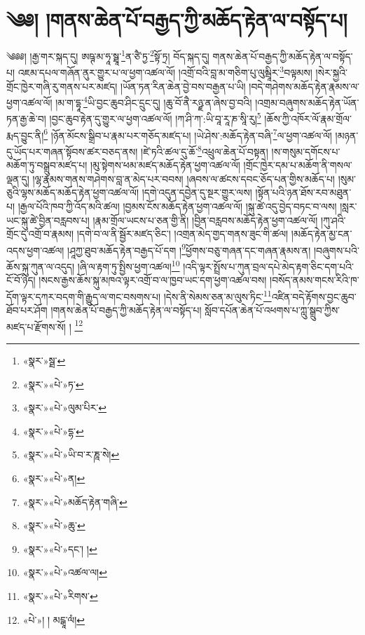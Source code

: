 \chapter{༄༅། །གནས་ཆེན་པོ་བརྒྱད་ཀྱི་མཆོད་རྟེན་ལ་བསྟོད་པ།}༄༅༅། །རྒྱ་གར་སྐད་དུ། ཨཥྚ་མ་ཧཱ་སྠཱ་\footnote{«སྣར་»སྠ་}ན་ཙཻ་ཏྱ་\footnote{«སྣར་»«པེ་»ཏ་}སྟོ་ཏྲ། བོད་སྐད་དུ། གནས་ཆེན་པོ་བརྒྱད་ཀྱི་མཆོད་རྟེན་ལ་བསྟོད་པ། འཇམ་དཔལ་གཞོན་ནུར་གྱུར་པ་ལ་ཕྱག་འཚལ་ལོ། །འགྲོ་བའི་བླ་མ་གཅིག་པུ་ལུམྦཱིར་\footnote{«སྣར་»«པེ་»ལུམ་པིར་}བལྟམས། །སེར་སྐྱའི་གྲོང་ཁྱེར་གཞི་རུ་གནས་པར་མཛད། །ཡོན་ཏན་རིན་ཆེན་བྱེ་བས་བརྒྱན་པ་ཡི། །བདེ་གཤེགས་མཆོད་རྟེན་རྣམས་ལ་ཕྱག་འཚལ་ལོ། །མ་ག་དྷཱ་\footnote{«སྣར་»«པེ་»དྷ་}ཡི་བྱང་ཆུབ་ཤིང་དྲུང་དུ། །ཆུ་བོ་ནཻ་རཉྫ་ན་ཞེས་བྱ་བའི། །འགྲམ་བཞུགས་མཆོད་རྟེན་ཡོན་ཏན་རྒྱ་ཆེ་བ། །བྱང་ཆུབ་རྟེན་དུ་གྱུར་ལ་ཕྱག་འཚལ་ལོ། །ཀ་ཤི་ཀ་:ཡི་བཱ་རཱ་ཎ་སཱི་རུ།\footnote{«སྣར་»«པེ་»ཡི་བ་ར་ཎཱ་སེ།} །ཆོས་ཀྱི་འཁོར་ལོ་རྣམ་གྲོལ་རྨད་བྱུང་ནི།\footnote{«སྣར་»«པེ་»ན།} །ཉོན་མོངས་སྒྲིབ་པ་རྣམ་པར་གཅོད་མཛད་པ། །ཡེ་ཤེས་:མཆོད་རྟེན་བཞི་\footnote{«སྣར་»«པེ་»མཆོད་རྟེན་གཞི་}ལ་ཕྱག་འཚལ་ལོ། །མཉན་དུ་ཡོད་པར་གཞན་སྟོབས་ཚར་བཅད་ནས། །ཛེ་ཏའི་ཚལ་དུ་ཆོ་\footnote{«སྣར་»«པེ་»ཆུ་}འཕྲུལ་ཆེན་པོ་བསྟན། །ས་གསུམ་དགོངས་པ་མཆོག་ཏུ་བསྒྲུབ་མཛད་པ། །མུ་སྟེགས་ཕམ་མཛད་མཆོད་རྟེན་ཕྱག་འཚལ་ལོ། །གྲོང་ཁྱེར་དམ་པ་མཆོག་ནི་གསལ་ལྡན་དུ། །ལྷ་རྣམས་གནས་གཤེགས་བླ་ན་མེད་པར་བབས། །ཞབས་ལ་ཚངས་དབང་ཅོད་པན་གྱིས་མཆོད་པ། །སུམ་ཅུའི་ལྷས་མཆོད་མཆོད་རྟེན་ཕྱག་འཚལ་ལོ། །དགེ་འདུན་དབྱེན་དུ་སྔར་གྱུར་ལས། །སྟོན་པའི་ཉན་ཐོས་རབ་མཐུན་པ། །རྒྱལ་པོའི་ཁབ་ཀྱི་འོད་མའི་ཚལ། །བྱམས་ངོས་མཆོད་རྟེན་ཕྱག་འཚལ་ལོ། །སྐུ་ཚེ་འདུ་བྱེད་བཏང་བ་ལས། །སླར་ཡང་སྐུ་ཚེ་བྱིན་བརླབས་པ། །རྣམ་གྲོལ་ཡངས་པ་ཅན་གྱི་ནི། །བྱིན་བརླབས་མཆོད་རྟེན་ཕྱག་འཚལ་ལོ། །ཀུ་ཤའི་གྲོང་དུ་འགྲོ་བ་རྣམས། །དགེ་བ་ལ་ནི་སྦྱོར་མཛད་ཅིང་། །འགྲན་མེད་གྱད་གནས་ཟུང་གི་ཚལ། །མཆོད་རྟེན་མྱ་ངན་འདས་ཕྱག་འཚལ། །ཤཱཀྱ་ཐུབ་མཆོད་རྟེན་བརྒྱད་པོ་དག །\footnote{«སྣར་»«པེ་»དང་། །}ཕྱོགས་བཅུ་གཞན་དང་གཞན་རྣམས་ན། །བཞུགས་པའི་ཆོས་སྐུ་ཀུན་ལ་འདུད། །ཞི་ལ་རྟག་ཏུ་སྤྱིས་ཕྱག་འཚལ།\footnote{«སྣར་»«པེ་»འཚལ་ལ།} །འདི་ལྟར་སྤྲོས་པ་ཀུན་བྲལ་དཔེ་མེད་རྟག་ཅིང་དག་པའི་ངོ་བོ་ཉིད། །སངས་རྒྱས་ཆོས་སྐུ་མཁའ་ལྟར་འགྲོ་བ་ལ་ཁྱབ་ཡང་དག་ཕྱག་འཚལ་བས། །བསོད་ནམས་གངས་རིའི་ཁ་དོག་ལྟར་དཀར་བདག་གི་རྒྱུད་ལ་གང་བསགས་པ། །དེས་ནི་སེམས་ཅན་མ་ལུས་ཏིང་\footnote{«སྣར་»«པེ་»རིགས་}འཛིན་བདེ་རྟོགས་བྱང་ཆུབ་ཐོབ་པར་ཤོག །གནས་ཆེན་པོ་བརྒྱད་ཀྱི་མཆོད་རྟེན་ལ་བསྟོད་པ། སློབ་དཔོན་ཆེན་པོ་འཕགས་པ་ཀླུ་སྒྲུབ་ཀྱིས་མཛད་པ་རྫོགས་སོ། ། \footnote{«པེ་»། ། མངྒཱ་ལཾ།}